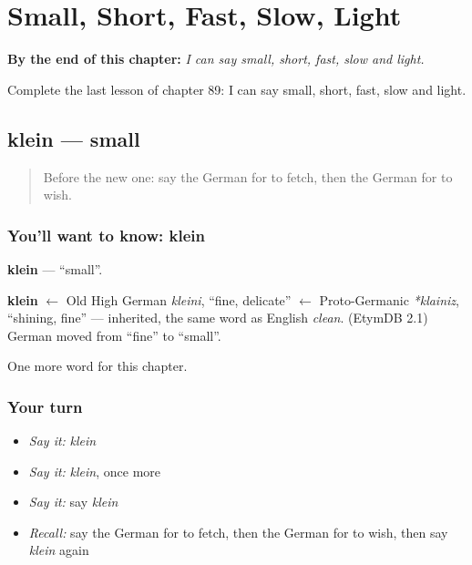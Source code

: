 
\chapter{Small, Short, Fast, Slow, Light}
\label{ch:ge-small-short-fast-slow-light}

\begin{chapteropening}
\textbf{By the end of this chapter:} \emph{I can say small, short, fast, slow and light.}

Complete the last lesson of chapter 89: I can say small, short, fast, slow and light.
\end{chapteropening}

\section[klein]{klein — small}

\label{lesson:GE-C89-klein}



\begin{quote}
Before the new one: say the German for to fetch, then the German for to wish.
\end{quote}

\subsection*{You'll want to know: klein}
\textbf{klein} — \textquotedblleft{}small\textquotedblright{}.

\begin{cousinweb}
\textbf{klein} $\leftarrow$ Old High German \emph{kleini}, \textquotedblleft{}fine, delicate\textquotedblright{} $\leftarrow$ Proto-Germanic \emph{*klainiz}, \textquotedblleft{}shining, fine\textquotedblright{} — inherited, the same word as English \emph{clean}. (EtymDB 2.1) German moved from \textquotedblleft{}fine\textquotedblright{} to \textquotedblleft{}small\textquotedblright{}.
\end{cousinweb}

\begin{grammarlens}[title={What you've built}]
One more word for this chapter.
\end{grammarlens}

\subsection*{Your turn}
\begin{itemize}
\raggedright
  \item \emph{Say it:} \emph{klein}
  \item \emph{Say it:} \emph{klein}, once more
  \item \emph{Say it:} say \emph{klein}
  \item \emph{Recall:} say the German for to fetch, then the German for to wish, then say \emph{klein} again
\end{itemize}

